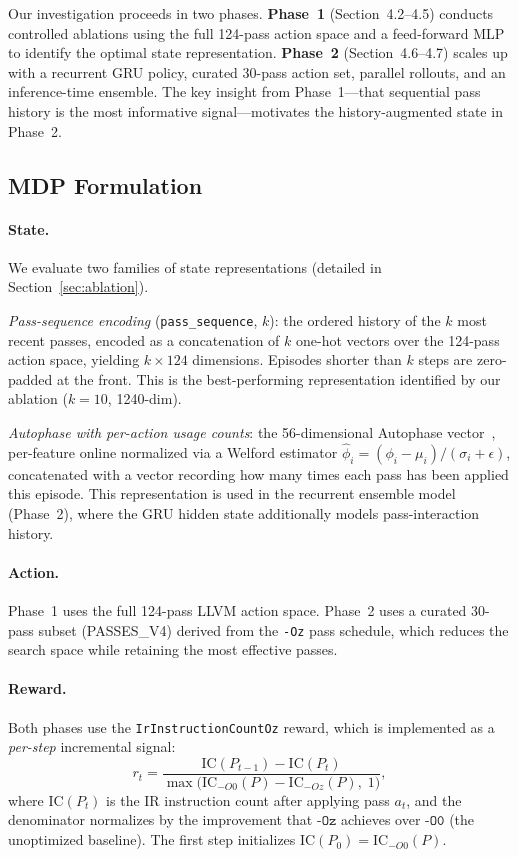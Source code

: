 \documentclass{article}
\begin{document}
Our investigation proceeds in two phases.
\textbf{Phase~1} (Section~4.2--4.5) conducts controlled ablations using
the full 124-pass action space and a feed-forward MLP to identify the
optimal state representation.
\textbf{Phase~2} (Section~4.6--4.7) scales up with a recurrent GRU policy,
curated 30-pass action set, parallel rollouts, and an inference-time ensemble.
The key insight from Phase~1---that sequential pass history is the most
informative signal---motivates the history-augmented state in Phase~2.

\subsection{MDP Formulation}

\paragraph{State.}
We evaluate two families of state representations (detailed in
Section~\ref{sec:ablation}).

\textit{Pass-sequence encoding} (\texttt{pass\_sequence}, $k$): the ordered
history of the $k$ most recent passes, encoded as a concatenation of $k$
one-hot vectors over the 124-pass action space, yielding $k \times 124$
dimensions.  Episodes shorter than $k$ steps are zero-padded at the front.
This is the best-performing representation identified by our ablation
($k{=}10$, 1240-dim).

\textit{Autophase with per-action usage counts}: the 56-dimensional Autophase
vector~\cite{8735549}, per-feature online normalized via a Welford estimator
$\hat{\phi}_i = (\phi_i - \mu_i)/(\sigma_i + \epsilon)$, concatenated with a
vector recording how many times each pass has been applied this episode.  This
representation is used in the recurrent ensemble model (Phase~2), where the GRU
hidden state additionally models pass-interaction history.

\paragraph{Action.}
Phase~1 uses the full 124-pass LLVM action space.  Phase~2 uses a curated
30-pass subset (PASSES\_V4) derived from the \texttt{-Oz} pass schedule,
which reduces the search space while retaining the most effective passes.

\paragraph{Reward.}
Both phases use the \texttt{IrInstructionCountOz} reward, which is
implemented as a \emph{per-step} incremental signal:
\begin{equation}
  r_t = \frac{\mathrm{IC}(P_{t-1}) - \mathrm{IC}(P_t)}
             {\max\!\bigl(\mathrm{IC}_{-O0}(P) - \mathrm{IC}_{-Oz}(P),\; 1\bigr)},
  \label{eq:reward}
\end{equation}
where $\mathrm{IC}(P_t)$ is the IR instruction count after applying pass
$a_t$, and the denominator normalizes by the improvement that
$\texttt{-Oz}$ achieves over $\texttt{-O0}$ (the unoptimized baseline).
The first step initializes $\mathrm{IC}(P_0) = \mathrm{IC}_{-O0}(P)$.
\end{document}
